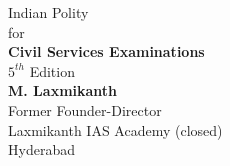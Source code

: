 \documentclass[
    pdftex,
    fontsize=11pt,
    a4paper
   ]{scrbook}
\begin{document}
\begin{titlepage}
\thispagestyle{empty}
\vspace*{7em}
\begin{center}
	{\fontsize{50}{60}\selectfont Indian Polity}\\
	\vspace*{2em}
	\Large{for\\ \vspace*{1em}\textbf{Civil Services Examinations}\\$5^{th}$ Edition}\\
	\vspace*{4em}
	{\LARGE\textbf{M. Laxmikanth}\\}
	Former Founder-Director\\Laxmikanth IAS Academy (closed)\\Hyderabad
\end{center}
\end{titlepage}
\end{document}
